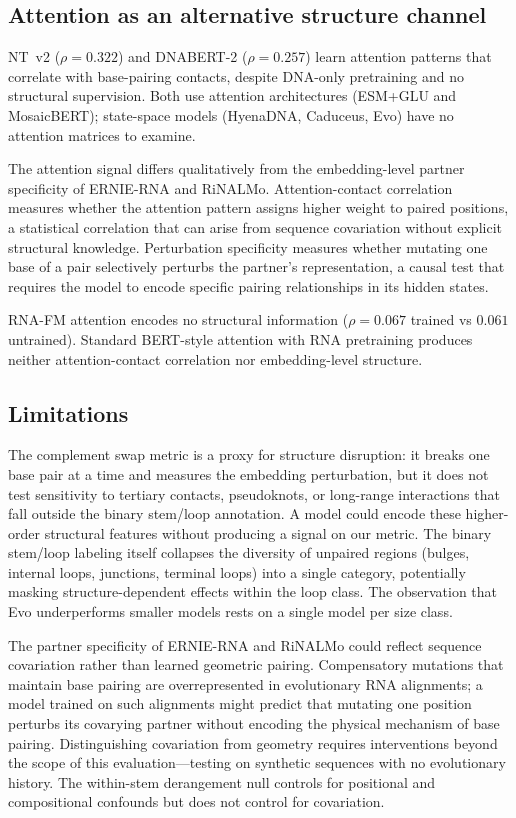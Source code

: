 \documentclass[11pt]{article}
\begin{document}
\subsection{Attention as an alternative structure channel}
\label{sec:attention_channel}

NT~v2 ($\rho = 0.322$) and DNABERT-2 ($\rho = 0.257$) learn
attention patterns that correlate with base-pairing contacts, despite
DNA-only pretraining and no structural supervision.  Both use
attention architectures (ESM+GLU and MosaicBERT); state-space models
(HyenaDNA, Caduceus, Evo) have no attention matrices to examine.

The attention signal differs qualitatively from the embedding-level
partner specificity of ERNIE-RNA and RiNALMo.  Attention-contact
correlation measures whether the attention pattern assigns higher
weight to paired positions, a statistical correlation that can arise
from sequence covariation without explicit structural knowledge.
Perturbation specificity measures whether mutating one base of a pair
selectively perturbs the partner's representation, a causal test that
requires the model to encode specific pairing relationships in its
hidden states.

RNA-FM attention encodes no structural information ($\rho = 0.067$
trained vs $0.061$ untrained).  Standard BERT-style attention with
RNA pretraining produces neither attention-contact correlation nor
embedding-level structure.

\subsection{Limitations}
\label{sec:limitations}

The complement swap metric is a proxy for structure disruption: it
breaks one base pair at a time and measures the embedding perturbation,
but it does not test sensitivity to tertiary contacts, pseudoknots, or
long-range interactions that fall outside the binary stem/loop
annotation.  A model could encode these higher-order structural
features without producing a signal on our metric.  The binary
stem/loop labeling itself collapses the diversity of unpaired regions
(bulges, internal loops, junctions, terminal loops) into a single
category, potentially masking structure-dependent effects within the
loop class.  The observation that Evo underperforms smaller models
rests on a single model per size class.

The partner specificity of ERNIE-RNA and RiNALMo could reflect
sequence covariation rather than learned geometric pairing.
Compensatory mutations that maintain base pairing are overrepresented
in evolutionary RNA alignments; a model trained on such alignments
might predict that mutating one position perturbs its covarying
partner without encoding the physical mechanism of base pairing.
Distinguishing covariation from geometry requires interventions beyond
the scope of this evaluation---testing on synthetic sequences with no
evolutionary history.  The within-stem derangement null controls for
positional and compositional confounds but does not control for
covariation.
\end{document}
